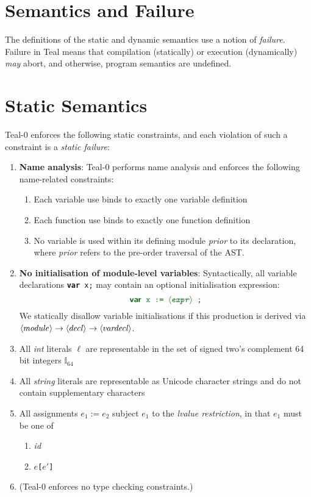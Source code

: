 \documentclass{article}
\newcommand{\ntaX}[1]{\ensuremath{\textit{#1}}}
\newcommand{\tuple}[1]{\ensuremath{\langle #1 \rangle}}
\newcommand{\terminal}[1]{\textit{#1}}
\newcommand{\vterminal}[1]{\textsf{\textcolor{dgreen}{\texttt{#1}}}}
\newcommand{\nt}[1]{\ensuremath{\tuple{\hspace{-0.02cm}\ntaX{#1}\hspace{0.02cm}}}}
\newcommand{\nta}[1]{\nt{#1}}
\newcommand{\Ckw}[1]{{\textsf{\textbf{#1}}}}
\newcommand{\code}[1]{\texttt{\textcolor{dgreen}{#1}}}
\newcommand{\failure}{\textcolor{dred}{failure}}
\begin{document}
\section{Semantics and Failure}
The definitions of the static and dynamic semantics use a notion of
\emph{\failure{}}.  Failure in Teal means that compilation (statically)
or execution (dynamically) \emph{may} abort, and otherwise, program
semantics are undefined.

\section{Static Semantics}

Teal-0 enforces the following static constraints, and each violation of such a constraint is a \emph{static \failure}:
\begin{enumerate}

\item \textbf{Name analysis}: Teal-0 performs name analysis and enforces the following name-related constraints:
  \begin{enumerate}
    \item Each variable use binds to exactly one variable definition
    \item Each function use binds to exactly one function definition
    \item No variable is used within its defining module \emph{prior}
      to its declaration, where \emph{prior} refers to the pre-order
      traversal of the AST.
  \end{enumerate}

\item \textbf{No initialisation of module-level variables}:
  Syntactically, all variable declarations \code{\Ckw{var} x;} may contain an optional initialisation expression:
  \[
  \code{\Ckw{var} x := \nt{expr} ;}
    \]
    We statically disallow variable initialisations if this production
    is derived via
    $\nta{module}\rightarrow\nta{decl}\rightarrow\nta{vardecl}$.
  \item All \terminal{int} literals $\ell$ are representable in the set of signed two's complement 64 bit integers $\mathbb{I}_{64}$
  \item All \terminal{string} literals are representable as Unicode character strings and do not contain supplementary characters
  \item All assignments \vterminal{$e_1 := e_2$} subject $e_1$ to the \emph{lvalue restriction}, in that $e_1$ must be one of
    \begin{enumerate}
      \item \terminal{id}
      \item \vterminal{$e$[$e'$]}
    \end{enumerate}
\item (Teal-0 enforces no type checking constraints.)
\end{enumerate}
\end{document}
